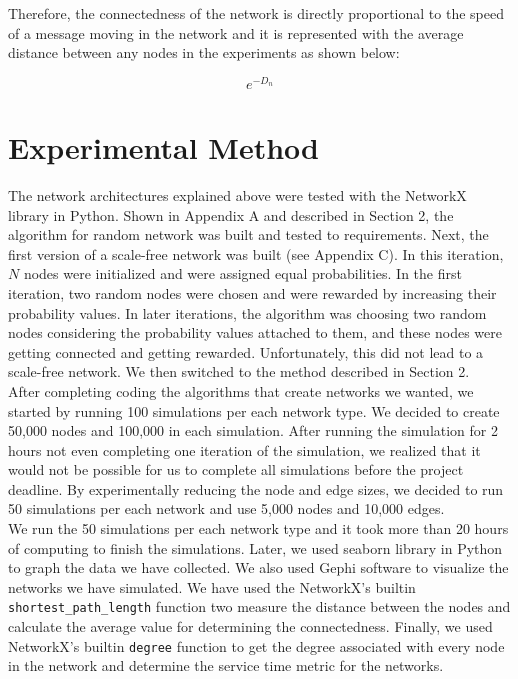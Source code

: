\documentclass[journal]{IEEEtran}
\begin{document}
\noindent Therefore, the connectedness of the network is directly proportional to the speed of a message moving in the network and it is represented with the average distance between any nodes in the experiments as shown below:

\begin{equation}
    e^{-D_n}
    \label{eq:connectedness_eq}
\end{equation}

\section{Experimental Method}
\noindent The network architectures explained above were tested with the NetworkX library in Python. Shown in Appendix A and described in Section 2, the algorithm for random network was built and tested to requirements. Next, the first version of a scale-free network was built (see Appendix C). In this iteration, $N$ nodes were initialized and were assigned equal probabilities. In the first iteration, two random nodes were chosen and were rewarded by increasing their probability values. In later iterations, the algorithm was choosing two random nodes considering the probability values attached to them, and these nodes were getting connected and getting rewarded. Unfortunately, this did not lead to a scale-free network. We then switched to the method described in Section 2.\\

\noindent After completing coding the algorithms that create networks we wanted, we started by running 100 simulations per each network type. We decided to create 50,000 nodes and 100,000 in each simulation. After running the simulation for 2 hours not even completing one iteration of the simulation, we realized that it would not be possible for us to complete all simulations before the project deadline. By experimentally reducing the node and edge sizes, we decided to run 50 simulations per each network and use 5,000 nodes and 10,000 edges. \\

\noindent We run the 50 simulations per each network type and it took more than 20 hours of computing to finish the simulations. Later, we used seaborn library in Python to graph the data we have collected. We also used Gephi software to visualize the networks we have simulated. We have used the NetworkX's builtin \texttt{shortest\_path\_length} function two measure the distance between the nodes and calculate the average value for determining the connectedness. Finally, we used NetworkX's builtin \texttt{degree} function to get the degree associated with every node in the network and determine the service time metric for the networks.
\end{document}
